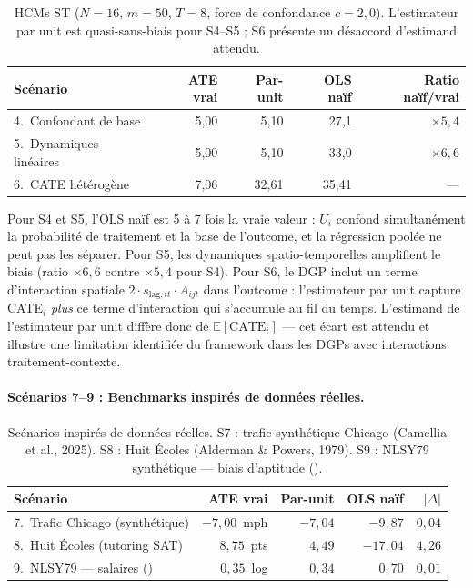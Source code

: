 \documentclass[11pt,a4paper]{article}
\begin{document}
\begin{table}[h!]
\centering
\caption{HCMs ST ($N=16$, $m=50$, $T=8$, force de confondance $c=2{,}0$). L'estimateur par unit est quasi-sans-biais pour S4–S5 ; S6 présente un désaccord d'estimand attendu.}
\label{tab:benchmark_st}
\begin{tabular}{lrrrr}
\toprule
\textbf{Scénario} & \textbf{ATE vrai} & \textbf{Par-unit} & \textbf{OLS naïf} & \textbf{Ratio naïf/vrai} \\
\midrule
4.\ Confondant de base        & 5{,}00 &  5{,}10 & 27{,}1 & $\times 5{,}4$ \\
5.\ Dynamiques linéaires      & 5{,}00 &  5{,}10 & 33{,}0 & $\times 6{,}6$ \\
6.\ CATE hétérogène           & 7{,}06 & 32{,}61 & 35{,}41 & --- \\
\bottomrule
\end{tabular}
\end{table}

Pour S4 et S5, l'OLS naïf est 5 à 7 fois la vraie valeur : $U_i$ confond simultanément la probabilité de traitement et la base de l'outcome, et la régression poolée ne peut pas les séparer.
Pour S5, les dynamiques spatio-temporelles amplifient le biais (ratio $\times 6{,}6$ contre $\times 5{,}4$ pour S4).
Pour S6, le DGP inclut un terme d'interaction spatiale $2 \cdot s_{\text{lag},it} \cdot A_{ijt}$ dans l'outcome : l'estimateur par unit capture CATE$_i$ \emph{plus} ce terme d'interaction qui s'accumule au fil du temps.
L'estimand de l'estimateur par unit diffère donc de $\mathbb{E}[\text{CATE}_i]$ — cet écart est attendu et illustre une limitation identifiée du framework dans les DGPs avec interactions traitement-contexte.

\paragraph{Scénarios 7–9 : Benchmarks inspirés de données réelles.}

\begin{table}[h!]
\centering
\caption{Scénarios inspirés de données réelles. S7 : trafic synthétique Chicago (Camellia et al., 2025). S8 : Huit Écoles (Alderman \& Powers, 1979). S9 : NLSY79 synthétique — biais d'aptitude (\citealt{Card1995}).}
\label{tab:benchmark_realworld}
\begin{tabular}{lrrrr}
\toprule
\textbf{Scénario} & \textbf{ATE vrai} & \textbf{Par-unit} & \textbf{OLS naïf} & $|\Delta|$ \\
\midrule
7.\ Trafic Chicago (synthétique) & $-7{,}00$~mph &  $-7{,}04$ & $-9{,}87$ & $0{,}04$ \\
8.\ Huit Écoles (tutoring SAT)   &  $8{,}75$~pts &   $4{,}49$ & $-17{,}04$ & $4{,}26$ \\
9.\ NLSY79 — salaires (\citealt{Card1995}) & $0{,}35$~log & $0{,}34$ & $0{,}70$ & $0{,}01$ \\
\bottomrule
\end{tabular}
\end{table}
\end{document}
